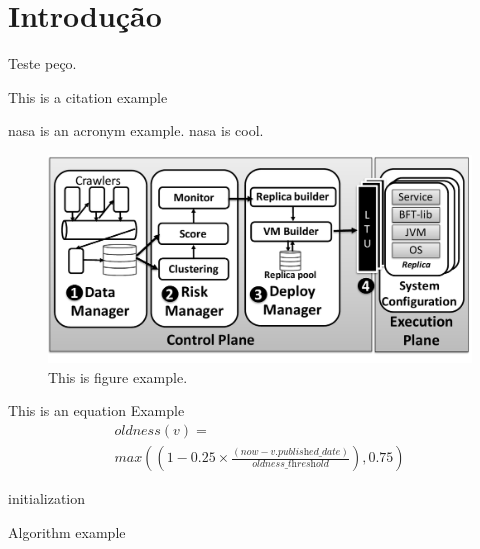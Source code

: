 \chapter{Introdução}
\label{chap:introduction}

Teste peço.


This is a citation example~\cite{Garcia:2018}

\gls{nasa} is an acronym example. \gls{nasa} is cool.

\begin{figure}[h]
\begin{center}
\includegraphics[width=\columnwidth]{images/figure_example.pdf}
\caption{This is figure example.}
\label{fig:overview}
\end{center}
\end{figure}



This is an equation Example
\begin{equation} 
\begin{split}
\textit{oldness}(v)=\\\textit{max}\left((1-0.25\times\frac{(\textit{now}-v.\textit{published\_date})}{\textit{oldness\_threshold}}), 0.75\right)
\label{eq:oldness}
\end{split}
\end{equation}

\begin{algorithm}[H]
\SetAlgoLined
{}
 initialization\;
 \caption{Algorithm example}
\end{algorithm}




